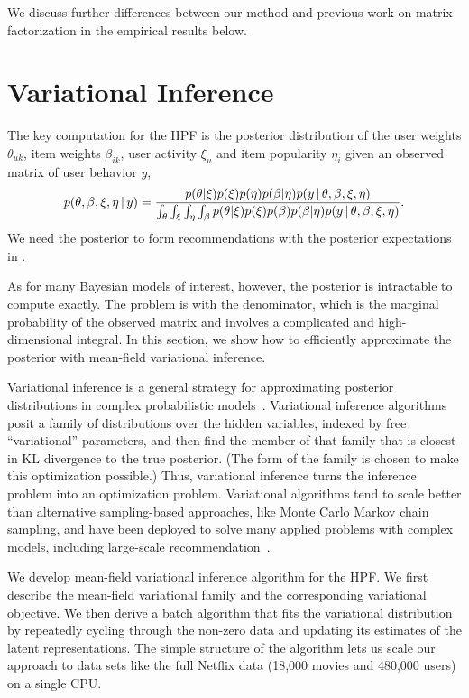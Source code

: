 \documentclass{sig-alternate}
\begin{document}
We discuss further differences between our method and previous work on
matrix factorization in the empirical results below.


\section{Variational Inference}
\label{sec:inference}

The key computation for the HPF is the posterior distribution of the
user weights $\theta_{uk}$, item weights $\beta_{ik}$, user activity
$\xi_{u}$ and item popularity $\eta_i$ given an observed matrix
of user behavior $y$,
\begin{equation*}
  p(\theta, \beta, \xi, \eta \,\vert\, y) = \frac{p(\theta | \xi) p(\xi)
    p(\eta) p(\beta | \eta) p(y \,\vert\, \theta, \beta, \xi, \eta)}
  {\int_{\theta} \int_{\xi} \int_{\eta} \int_{\beta} p(\theta |
    \xi) p(\xi) p(\beta) p(\beta | \eta) p(y \,\vert\, \theta, \beta, \xi, \eta)}.
\end{equation*}
We need the posterior to form recommendations with the posterior
expectations in .

As for many Bayesian models of interest, however, the posterior is
intractable to compute exactly.  The problem is with the denominator,
which is the marginal probability of the observed matrix and involves
a complicated and high-dimensional integral.  In this section, we show
how to efficiently approximate the posterior with mean-field
variational inference.

Variational inference is a general strategy for approximating
posterior distributions in complex probabilistic
models~\cite{Jordan:1999,Wainwright:2008}.  Variational inference
algorithms posit a family of distributions over the hidden variables,
indexed by free ``variational'' parameters, and then find the member
of that family that is closest in KL divergence to the true posterior.
(The form of the family is chosen to make this optimization possible.)
Thus, variational inference turns the inference problem into an
optimization problem.  Variational algorithms tend to scale better
than alternative sampling-based approaches, like Monte Carlo Markov
chain sampling, and have been deployed to solve many applied problems
with complex models, including large-scale recommendation~\cite{Paquet:2013p9197}.

We develop mean-field variational inference algorithm for the HPF.  We
first describe the mean-field variational family and the corresponding
variational objective.  We then derive a batch algorithm that fits the
variational distribution by repeatedly cycling through the non-zero
data and updating its estimates of the latent representations. The
simple structure of the algorithm lets us scale our approach to data
sets like the full Netflix data (18,000 movies and 480,000 users) on a
single CPU.
\end{document}
